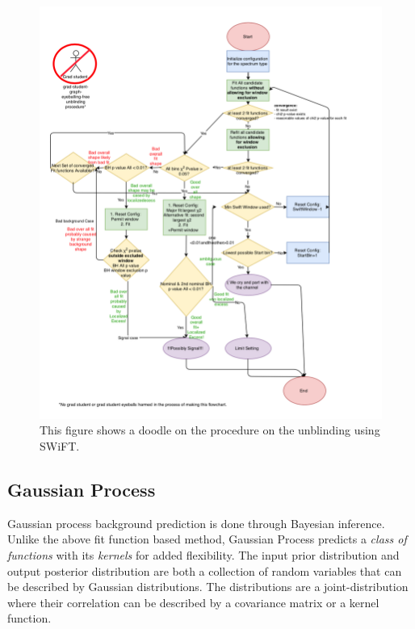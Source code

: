 \begin{figure}[!htb] \begin{center}
        \includegraphics[width=1.05\textwidth]{figures/chapter_analysismethod/swift_unblindingflowchart}
        \caption{
            This figure shows a doodle on the procedure on the unblinding using SWiFT.
        }
        \label{fig:unblinding}
    \end{center}
\end{figure}
\FloatBarrier
    
    \subsection{Gaussian Process} 

    Gaussian process background prediction is done through Bayesian inference. Unlike the above fit function based method, Gaussian Process predicts a \textit{class of functions} with its \textit{kernels} for added flexibility. The input prior distribution and output posterior distribution are both a collection of random variables that can be described by Gaussian distributions. The distributions are a joint-distribution where their correlation can be described by a covariance matrix or a kernel function. 

